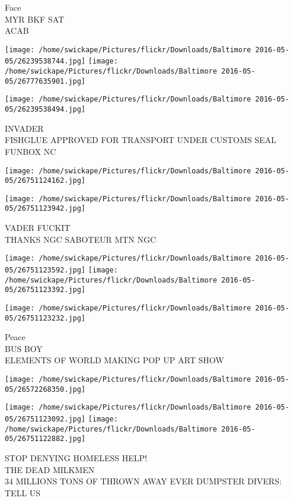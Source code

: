 \documentclass[10pt,letterpaper]{article}
\begin{document}
Face\\
MYR BKF SAT\\
ACAB\\
\pagebreak

\texttt{[image: /home/swickape/Pictures/flickr/Downloads/Baltimore 2016-05-05/26239538744.jpg]}
\texttt{[image: /home/swickape/Pictures/flickr/Downloads/Baltimore 2016-05-05/26777635901.jpg]}

\texttt{[image: /home/swickape/Pictures/flickr/Downloads/Baltimore 2016-05-05/26239538494.jpg]}

INVADER\\
FISHGLUE APPROVED FOR TRANSPORT UNDER CUSTOMS SEAL\\
FUNBOX NC\\
\pagebreak

\texttt{[image: /home/swickape/Pictures/flickr/Downloads/Baltimore 2016-05-05/26751124162.jpg]}

\vspace{0.25in}
\texttt{[image: /home/swickape/Pictures/flickr/Downloads/Baltimore 2016-05-05/26751123942.jpg]}

VADER FUCKIT\\
THANKS NGC SABOTEUR MTN NGC\\
\pagebreak

\texttt{[image: /home/swickape/Pictures/flickr/Downloads/Baltimore 2016-05-05/26751123592.jpg]}
\texttt{[image: /home/swickape/Pictures/flickr/Downloads/Baltimore 2016-05-05/26751123392.jpg]}

\texttt{[image: /home/swickape/Pictures/flickr/Downloads/Baltimore 2016-05-05/26751123232.jpg]}

Peace\\
BUS BOY\\
ELEMENTS OF WORLD MAKING POP UP ART SHOW\\
\pagebreak

\texttt{[image: /home/swickape/Pictures/flickr/Downloads/Baltimore 2016-05-05/26572268350.jpg]}

\vspace{0.25in}
\texttt{[image: /home/swickape/Pictures/flickr/Downloads/Baltimore 2016-05-05/26751123092.jpg]}
\texttt{[image: /home/swickape/Pictures/flickr/Downloads/Baltimore 2016-05-05/26751122882.jpg]}

STOP DENYING HOMELESS HELP!\\
THE DEAD MILKMEN\\
34 MILLIONS TONS OF THROWN AWAY EVER DUMPSTER DIVERS: TELL US\\
\pagebreak
\end{document}
